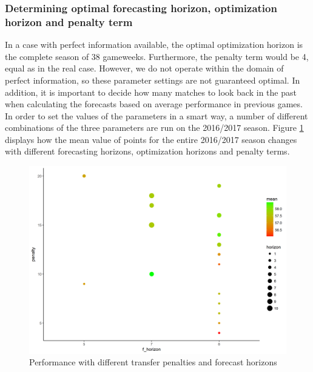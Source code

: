 \subsubsection{Determining optimal forecasting horizon, optimization horizon and penalty term}

In a case with perfect information available, the optimal optimization horizon is the complete season of 38 gameweeks. Furthermore, the penalty term would be 4, equal as in the real case. However, we do not operate within the domain of perfect information, so these parameter settings are not guaranteed optimal. In addition, it is important to decide how many matches to look back in the past when calculating the forecasts based on average performance in previous games.
\newpar 
In order to set the values of the parameters in a smart way, a number of different combinations of the three parameters are run on the 2016/2017 season. Figure \ref{Parameter_choice} displays how the mean value of points for the entire 2016/2017 season changes with different forecasting horizons, optimization horizons and penalty terms. 

\begin{figure}[H]
    \centering
    \includegraphics[scale=0.55]{fig/paramter_choice.png}
    \caption{Performance with different transfer penalties and forecast horizons}
\label{Parameter_choice}    
\end{figure}

